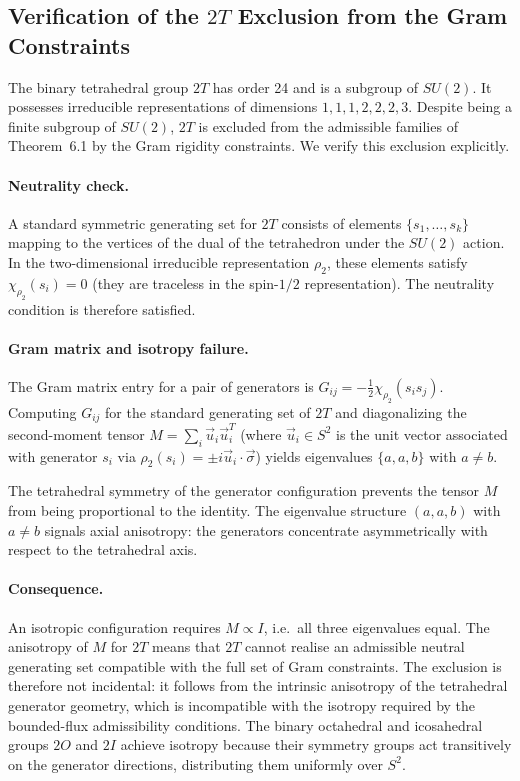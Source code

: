 
\subsection{Verification of the $2T$ Exclusion from the Gram Constraints}
  \label{subsec:2T-exclusion-verification}

  The binary tetrahedral group $2T$ has order 24 and is a subgroup of $SU(2)$.
  It possesses irreducible representations of dimensions $1,1,1,2,2,2,3$.
  Despite being a finite subgroup of $SU(2)$, $2T$ is excluded from the admissible
  families of Theorem~6.1 by the Gram rigidity constraints.
  We verify this exclusion explicitly.

  \paragraph{Neutrality check.}
    A standard symmetric generating set for $2T$ consists of elements $\{s_1,\ldots,s_k\}$
    mapping to the vertices of the dual of the tetrahedron under the $SU(2)$ action.
    In the two-dimensional irreducible representation $\rho_2$, these elements satisfy
    $\chi_{\rho_2}(s_i)=0$ (they are traceless in the spin-$1/2$ representation).
    The neutrality condition is therefore satisfied.

  \paragraph{Gram matrix and isotropy failure.}
    The Gram matrix entry for a pair of generators is
    $G_{ij} = -\tfrac{1}{2}\chi_{\rho_2}(s_i s_j)$.
    Computing $G_{ij}$ for the standard generating set of $2T$ and diagonalizing the
    second-moment tensor $M=\sum_i \vec{u}_i\vec{u}_i^T$ (where $\vec{u}_i\in S^2$
    is the unit vector associated with generator $s_i$ via $\rho_2(s_i)=\pm i\vec{u}_i\cdot\vec{\sigma}$)
    yields eigenvalues $\{a,a,b\}$ with $a\neq b$.

    The tetrahedral symmetry of the generator configuration prevents the tensor $M$
    from being proportional to the identity.
    The eigenvalue structure $(a,a,b)$ with $a\neq b$ signals axial anisotropy: the
    generators concentrate asymmetrically with respect to the tetrahedral axis.

  \paragraph{Consequence.}
    An isotropic configuration requires $M\propto I$, i.e.\ all three eigenvalues equal.
    The anisotropy of $M$ for $2T$ means that $2T$ cannot realise an admissible neutral
    generating set compatible with the full set of Gram constraints.
    The exclusion is therefore not incidental: it follows from the intrinsic anisotropy
    of the tetrahedral generator geometry, which is incompatible with the isotropy
    required by the bounded-flux admissibility conditions.
    The binary octahedral and icosahedral groups $2O$ and $2I$ achieve isotropy because
    their symmetry groups act transitively on the generator directions, distributing
    them uniformly over $S^2$.
